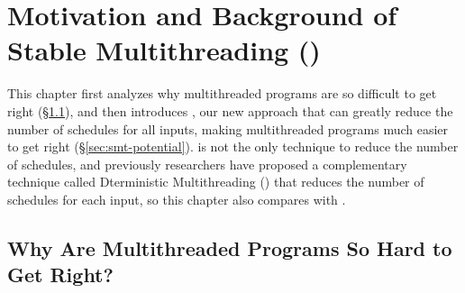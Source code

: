 \chapter{Motivation and Background of Stable Multithreading (\smt)}
\label{sec:smt-motivation}

This chapter first analyzes why multithreaded programs are so
difficult to get right (\S\ref{sec:smt-why}), and then introduces
\smt, our new approach that can greatly reduce the number of schedules for all
inputs, making multithreaded programs much easier to get right
(\S\ref{sec:smt-potential}). \smt is not the only technique to reduce the number
of schedules, and previously researchers have proposed a complementary technique
called Dterministic Multithreading (\dmt) that reduces the number of schedules
for each input, so this chapter also compares \smt with \dmt.

\section{Why Are Multithreaded Programs So Hard to Get Right?}
\label{sec:smt-why}

